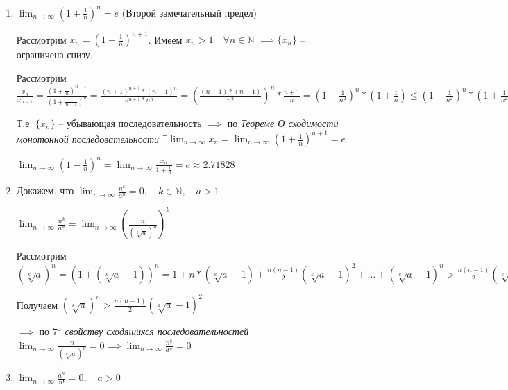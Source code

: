 \documentclass[a4paper,oneside]{article}
\newcommand{\dslim}{\displaystyle\lim}
\newcommand{\dslimn}{\dslim_{n \to \infty}}
\theoremstyle{definition}
\theoremstyle{definition}
\theoremstyle{definition}
\begin{document}
\begin{enumerate}
    \item 
        $\displaystyle \lim_{n \to \infty} \left( 1 + \frac{1}{n} \right)^n = e$ (Второй замечательный предел)
        
        Рассмотрим $x_n = \left( 1 + \frac{1}{n} \right)^{n + 1}$. 
        Имеем $x_n > 1 \quad \forall n \in \mathbb{N}$ $\implies \{x_n\}$ -- ограничена снизу.

        Рассмотрим $\frac{x_n}{x_{n-1}} = 
        \frac{\left( 1 + \frac{1}{n} \right)^{n - 1}}{\left( 1 + \frac{1}{n - 1} \right)^{n}}
        = \frac{(n + 1)^{n+1} * (n - 1)^n}{n^{n+1} * n^n}
        = \left( \frac{(n + 1) * (n - 1)}{n^2} \right)^n * \frac{n + 1}{n}
        = \left( 1 - \frac{1}{n^2} \right)^{n} * \left( 1 + \frac{1}{n} \right)
        \le \left( 1 - \frac{1}{n^2} \right)^{n} * \left( 1 + \frac{1}{n^2} \right)^n
        \le \left( 1 - \frac{1}{n^4} \right)^{n} < 1 \implies x_n < x_{n-1}$

        Т.е. $\{x_n\}$ -- убывающая последовательность $\implies$
        по \textit{Теореме О сходимости монотонной последовательности}
        $\exists \dslimn x_n = 
        \dslimn \left( 1 + \frac{1}{n} \right)^{n + 1} = e$

        $\dslimn \left( 1 - \frac{1}{n} \right)^{n}
        = \dslimn \frac{x_n}{1 + \frac{1}{n}} = e \approx 2.71828$


    \item 
        Докажем, что $\dslimn \frac{n^k}{a^n} = 0,
        \quad k \in \mathbb{N}, \quad a > 1$

        $\dslimn \frac{n^k}{a^n} = 
        \dslimn \left( \frac{n}{(\sqrt[k]{a})^n} \right)^k$

        Рассмотрим $(\sqrt[k]{a})^n = (1 + (\sqrt[k]{a} - 1)) ^ n = 
        1 + n * (\sqrt[k]{a} - 1) + \frac{n (n - 1)}{2} (\sqrt[k]{a} - 1)^2
        + \dots + (\sqrt[k]{a} - 1)^n > \frac{n (n - 1)}{2} (\sqrt[k]{a} - 1)^2$

        Получаем $(\sqrt[k]{a})^n > \frac{n (n - 1)}{2} (\sqrt[k]{a} - 1)^2$

        $\implies$ по \textit{$7^{\text{о}}$ свойству сходящихся последовательностей}
        $\dslimn \frac{n}{(\sqrt[k]{a})^n} = 0
        \implies \dslimn \frac{n^k}{a^n} = 0$


    \item 
        $\dslimn \frac{a^n}{n!} = 0, \quad a > 0$


\end{enumerate}
\end{document}
